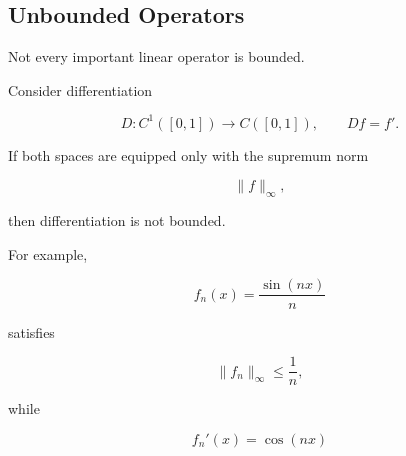 
\subsection{Unbounded Operators}
\label{subsec:unbounded-operators}

Not every important linear operator is bounded.

Consider differentiation

\[
D:C^1([0,1])\to C([0,1]),
\qquad
Df=f'.
\]

If both spaces are equipped only with the supremum norm

\[
\|f\|_\infty,
\]

then differentiation is not bounded.

For example,

\[
f_n(x)=\frac{\sin(nx)}{n}
\]

satisfies

\[
\|f_n\|_\infty\leq\frac1n,
\]

while

\[
f_n'(x)=\cos(nx)
\]

